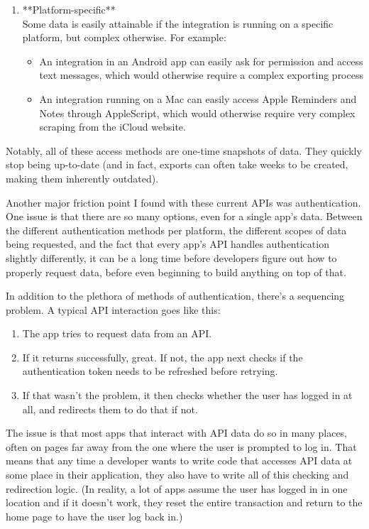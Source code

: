 \documentclass[manuscript,review,anonymous]{acmart}
\begin{document}
\begin{enumerate}
  \item **Platform-specific** \\
  Some data is easily attainable if the integration is running on a specific platform, but complex otherwise. For example:
  \begin{itemize}
    \item An integration in an Android app can easily ask for permission and access text messages, which would otherwise require a complex exporting process
    \item An integration running on a Mac can easily access Apple Reminders and Notes through AppleScript, which would otherwise require very complex scraping from the iCloud website.
  \end{itemize}
\end{enumerate}   

Notably, all of these access methods are one-time snapshots of data. They quickly stop being up-to-date (and in fact, exports can often take weeks to be created, making them inherently outdated). 

Another major friction point I found with these current APIs was authentication. One issue is that there are so many options, even for a single app's data. Between the different authentication methods per platform, the different scopes of data being requested, and the fact that every app's API handles authentication slightly differently, it can be a long time before developers figure out how to properly request data, before even beginning to build anything on top of that.

In addition to the plethora of methods of authentication, there's a sequencing problem. A typical API interaction goes like this: 
\begin{enumerate}
  \item The app tries to request data from an API.
  \item If it returns successfully, great. If not, the app next checks if the authentication token needs to be refreshed before retrying.
  \item If that wasn't the problem, it then checks whether the user has logged in at all, and redirects them to do that if not.
\end{enumerate}
The issue is that most apps that interact with API data do so in many places, often on pages far away from the one where the user is prompted to log in. That means that any time a developer wants to write code that accesses API data at some place in their application, they also have to write all of this checking and redirection logic. (In reality, a lot of apps assume the user has logged in in one location and if it doesn't work, they reset the entire transaction and return to the home page to have the user log back in.)
\end{document}
